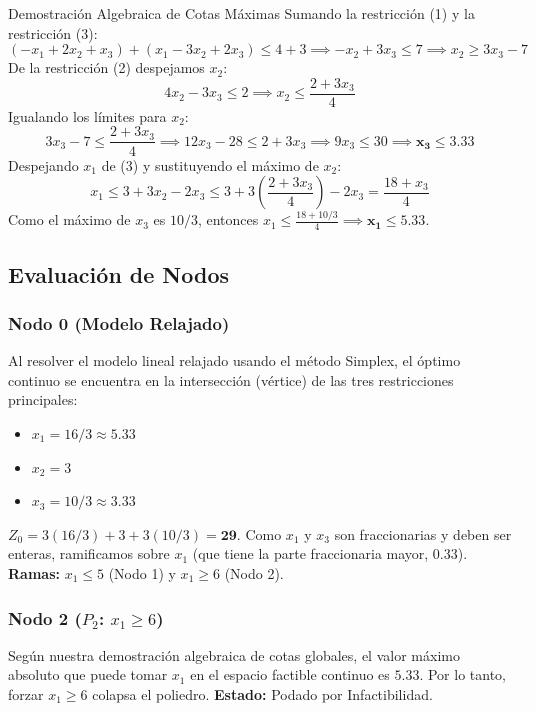 \documentclass[10pt,a4paper]{article}
\begin{document}
\begin{nota}{Demostración Algebraica de Cotas Máximas}
Sumando la restricción (1) y la restricción (3):
\[ (-x_1 + 2x_2 + x_3) + (x_1 - 3x_2 + 2x_3) \leq 4 + 3 \implies -x_2 + 3x_3 \leq 7 \implies x_2 \geq 3x_3 - 7 \]
De la restricción (2) despejamos $x_2$:
\[ 4x_2 - 3x_3 \leq 2 \implies x_2 \leq \frac{2 + 3x_3}{4} \]
Igualando los límites para $x_2$:
\[ 3x_3 - 7 \leq \frac{2 + 3x_3}{4} \implies 12x_3 - 28 \leq 2 + 3x_3 \implies 9x_3 \leq 30 \implies \mathbf{x_3 \leq 3.33} \]
Despejando $x_1$ de (3) y sustituyendo el máximo de $x_2$:
\[ x_1 \leq 3 + 3x_2 - 2x_3 \leq 3 + 3\left(\frac{2+3x_3}{4}\right) - 2x_3 = \frac{18 + x_3}{4} \]
Como el máximo de $x_3$ es $10/3$, entonces $x_1 \leq \frac{18 + 10/3}{4} \implies \mathbf{x_1 \leq 5.33}$.
\end{nota}


\subsection{Evaluación de Nodos}

\subsubsection*{Nodo 0 (Modelo Relajado)}
Al resolver el modelo lineal relajado usando el método Simplex, el óptimo continuo se encuentra en la intersección (vértice) de las tres restricciones principales:
\begin{itemize}
    \item $x_1 = 16/3 \approx 5.33$
    \item $x_2 = 3$
    \item $x_3 = 10/3 \approx 3.33$
\end{itemize}
$Z_0 = 3(16/3) + 3 + 3(10/3) = \mathbf{29}$. 
Como $x_1$ y $x_3$ son fraccionarias y deben ser enteras, ramificamos sobre $x_1$ (que tiene la parte fraccionaria mayor, $0.33$).
\textbf{Ramas:} $x_1 \leq 5$ (Nodo 1) y $x_1 \geq 6$ (Nodo 2).

\subsubsection*{Nodo 2 ($P_2$: $x_1 \geq 6$)}
Según nuestra demostración algebraica de cotas globales, el valor máximo absoluto que puede tomar $x_1$ en el espacio factible continuo es $5.33$. Por lo tanto, forzar $x_1 \geq 6$ colapsa el poliedro.
\textbf{Estado:} Podado por Infactibilidad.
\end{document}
